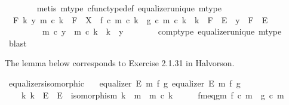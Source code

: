 \begin{isabellebody}
\ \ \ \ \ \ \isamarkupfalse%
\ {\isacharparenleft}{\kern0pt}metis\ m{\isacharunderscore}{\kern0pt}type{}\ cfunc{\isacharunderscore}{\kern0pt}type{\isacharunderscore}{\kern0pt}def\ equalizer{\isacharunderscore}{\kern0pt}unique\ m{\isacharunderscore}{\kern0pt}type{\isacharparenright}{\kern0pt}\isanewline
\isanewline
\ \ \ \ \isamarkupfalse%
\ {\isachardoublequoteopen}{\isasymAnd}\ F\ k\ y{\isachardot}{\kern0pt}\ m\ {\isasymcirc}\isactrlsub c\ k\ {\isacharcolon}{\kern0pt}\ F\ {\isasymrightarrow}\ X\ {\isasymLongrightarrow}\ f\ {\isasymcirc}\isactrlsub c\ m\ {\isasymcirc}\isactrlsub c\ k\ {\isacharequal}{\kern0pt}\ g\ {\isasymcirc}\isactrlsub c\ m\ {\isasymcirc}\isactrlsub c\ k\ {\isasymLongrightarrow}\ k\ {\isacharcolon}{\kern0pt}\ F\ {\isasymrightarrow}\ E\ {\isasymLongrightarrow}\ y\ {\isacharcolon}{\kern0pt}\ F\ {\isasymrightarrow}\ E\isanewline
\ \ \ \ \ \ \ \ {\isasymLongrightarrow}\ m\ {\isasymcirc}\isactrlsub c\ y\ {\isacharequal}{\kern0pt}\ m\ {\isasymcirc}\isactrlsub c\ k\ {\isasymLongrightarrow}\ k\ {\isacharequal}{\kern0pt}\ y{\isachardoublequoteclose}\isanewline
\ \ \ \ \ \ \isamarkupfalse%
\ comp{\isacharunderscore}{\kern0pt}type\ equalizer{\isacharunderscore}{\kern0pt}unique\ m{\isacharunderscore}{\kern0pt}type\ \isamarkupfalse%
\ blast\isanewline
\ \ \isamarkupfalse%
\isanewline
{}\isamarkupfalse%
%
\endisatagproof
{\isafoldproof}%
%
\isadelimproof
%
\endisadelimproof
%
\begin{isamarkuptext}%
The lemma below corresponds to Exercise 2.1.31 in Halvorson.%
\end{isamarkuptext}\isamarkuptrue%
\isamarkupfalse%
\ equalizers{\isacharunderscore}{\kern0pt}isomorphic{\isacharcolon}{\kern0pt}\isanewline
\ \ \ {\isachardoublequoteopen}equalizer\ E\ m\ f\ g{\isachardoublequoteclose}\ {\isachardoublequoteopen}equalizer\ E{\isacharprime}{\kern0pt}\ m{\isacharprime}{\kern0pt}\ f\ g{\isachardoublequoteclose}\isanewline
\ \ \ {\isachardoublequoteopen}{\isasymexists}\ k{\isachardot}{\kern0pt}\ k\ {\isacharcolon}{\kern0pt}\ E\ {\isasymrightarrow}\ E{\isacharprime}{\kern0pt}\ {\isasymand}\ isomorphism\ k\ {\isasymand}\ m\ {\isacharequal}{\kern0pt}\ m{\isacharprime}{\kern0pt}\ {\isasymcirc}\isactrlsub c\ k{\isachardoublequoteclose}\isanewline
%
\isadelimproof
%
\endisadelimproof
%
\isatagproof
{}\isamarkupfalse%
\ {\isacharminus}{\kern0pt}\isanewline
\ \ \isamarkupfalse%
\ fm{\isacharunderscore}{\kern0pt}eq{\isacharunderscore}{\kern0pt}gm{\isacharcolon}{\kern0pt}\ {\isachardoublequoteopen}f\ {\isasymcirc}\isactrlsub c\ m\ {\isacharequal}{\kern0pt}\ g\ {\isasymcirc}\isactrlsub c\ m{\isachardoublequoteclose}\isanewline

\end{isabellebody}
